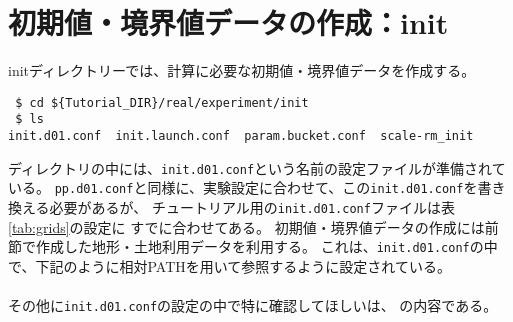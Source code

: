 \section{初期値・境界値データの作成：init} \label{sec:tutrial_real_init}

initディレクトリーでは、\scalerm 計算に必要な初期値・境界値データを作成する。
\begin{verbatim}
 $ cd ${Tutorial_DIR}/real/experiment/init
 $ ls 
init.d01.conf  init.launch.conf  param.bucket.conf  scale-rm_init
\end{verbatim}
ディレクトリの中には、\verb|init.d01.conf|という名前の設定ファイルが準備されている。
\verb|pp.d01.conf|と同様に、実験設定に合わせて、この\verb|init.d01.conf|を書き換える必要があるが、
チュートリアル用の\verb|init.d01.conf|ファイルは表\ref{tab:grids}の設定に
すでに合わせてある。
初期値・境界値データの作成には前節で作成した地形・土地利用データを利用する。
これは、\verb|init.d01.conf|の中で、下記のように相対PATHを用いて参照するように設定されている。\\

\\

\noindent その他に\verb|init.d01.conf|の設定の中で特に確認してほしいは、
の内容である。\\

